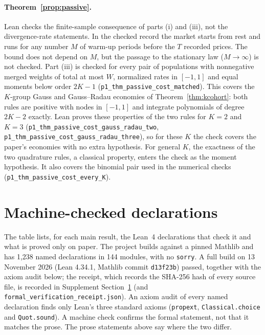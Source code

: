 \documentclass[12pt]{article}
\theoremstyle{definition}
\theoremstyle{remark}
\begin{document}
\paragraph{Theorem~\ref{prop:passive}.}
Lean checks the finite-sample consequence of parts (i) and (iii), not the divergence-rate statements. In the checked record the market starts from rest and runs for any number $M$ of warm-up periods before the $T$ recorded prices. The bound does not depend on $M$, but the passage to the stationary law ($M\to\infty$) is not checked. Part (iii) is checked for every pair of populations with nonnegative merged weights of total at most $W$, normalized rates in $[-1,1]$ and equal moments below order $2K-1$ (\texttt{p1\_thm\_passive\_cost\_matched}). This covers the $K$-group Gauss and Gauss--Radau economies of Theorem~\ref{thm:kcohort}: both rules are positive with nodes in $[-1,1]$ and integrate polynomials of degree $2K-2$ exactly. Lean proves these properties of the two rules for $K=2$ and $K=3$ (\texttt{p1\_thm\_passive\_cost\_gauss\_radau\_two}, \texttt{p1\_thm\_passive\_cost\_gauss\_radau\_three}), so for these $K$ the check covers the paper's economies with no extra hypothesis. For general $K$, the exactness of the two quadrature rules, a classical property, enters the check as the moment hypothesis. It also covers the binomial pair used in the numerical checks (\texttt{p1\_thm\_passive\_cost\_every\_K}).

\section{Machine-checked declarations}\label{app:verification}

The table lists, for each main result, the Lean~4 declarations that check it and what is proved only on paper. The project builds against a pinned Mathlib and has 1,238 named declarations in 144 modules, with no \texttt{sorry}. A full build on 13 November 2026 (Lean 4.34.1, Mathlib commit \texttt{d13f23b}) passed, together with the axiom audit below; the receipt, which records the SHA-256 hash of every source file, is recorded in Supplement Section~\ref{app:verification} (and \nolinkurl{formal_verification_receipt.json}). An axiom audit of every named declaration finds only Lean's three standard axioms (\texttt{propext}, \texttt{Classical.choice} and \texttt{Quot.sound}). A machine check confirms the formal statement, not that it matches the prose. The prose statements above say where the two differ.
\end{document}
